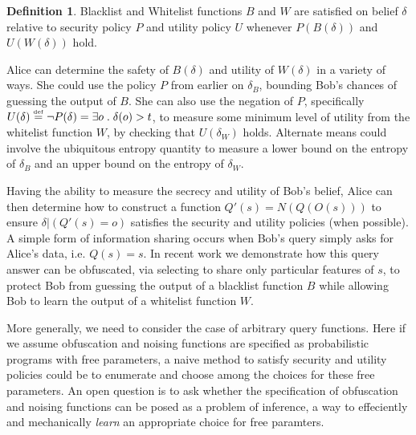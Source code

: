 \documentclass{article} %
\newcommand{\asecret}[0]{s}
\newcommand{\rsecret}[0]{s}
\newcommand{\paren}[1]{\left( #1 \right)}
\newcommand{\cond}[0]{|}
\newcommand{\qsep}[0]{\; . \;}
\newcommand{\stacklabel}[1]{\stackrel{\smash{\scriptscriptstyle \mathrm{#1}}}}
\newcommand{\defeq}{\stacklabel{def}=}
\theoremstyle{plain} %
\theoremstyle{definition} %
\newtheorem*{definition-un}{Definition}
\begin{document}
\begin{definition-un} Blacklist and Whitelist functions $ B $ and $ W $
  are satisfied on belief $ \delta $ relative to security policy $ P $
  and utility policy $ U $ whenever $P(B(\delta))$ and $U(W(\delta))$ hold.
\end{definition-un}

Alice can determine the safety of $ B(\delta) $ and utility of $
W(\delta) $ in a variety of ways. She could use the policy $ P $ from
earlier on $ \delta_B $, bounding Bob's chances of guessing the output
of $ B $. She can also use the negation of $ P $, specifically $
U(\delta) \defeq \neg P(\delta) = \exists o \qsep \delta(o) > t $, to
measure some minimum level of utility from the whitelist function $ W $,
by checking that $ U(\delta_W) $ holds. Alternate means could involve
the ubiquitous entropy quantity to measure a lower bound on the
entropy of $ \delta_B $ and an upper bound on the entropy of $
\delta_W $.


Having the ability to measure the secrecy and utility of Bob's belief,
Alice can then determine how to construct a function $ Q'(\asecret) =
N(Q(O(\asecret))) $ to ensure $ \delta \cond \paren{Q'(\rsecret) = o} $
satisfies the security and utility policies (when possible).
A simple form of information sharing occurs when Bob's
query simply asks for Alice's data, i.e. $Q(\asecret) = \rsecret $.
In recent work \cite{chakraborty12balancing} we demonstrate how this
query answer can be obfuscated, via selecting to share only particular
features of $ \asecret $, to protect Bob from guessing the output of
a blacklist function $ B $ while allowing Bob to learn the output of
a whitelist function $ W $.

More generally, we need to consider the case of arbitrary query functions.
Here if we assume obfuscation and noising functions are specified as
probabilistic programs with free parameters, a naive method to satisfy
security and utility policies could be to enumerate and choose among
the choices for these free parameters.
An open question is to ask whether the
specification of obfuscation and noising functions can be posed as a problem
of inference, a way to effeciently and mechanically \emph{learn} an appropriate
choice for free paramters.
\end{document}
